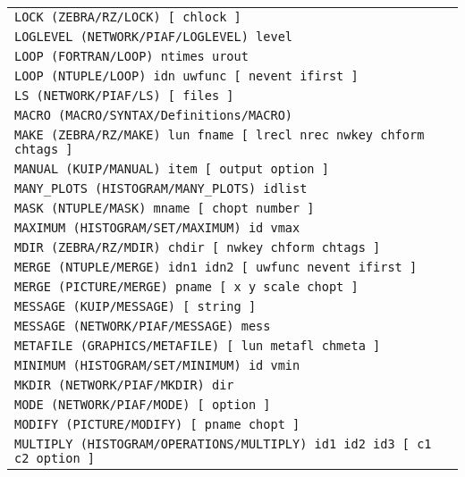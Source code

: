 \begin{longtable}{|>{\footnotesize\tt}lr|}
LOCK (ZEBRA/RZ/LOCK)  [ chlock ] & \pageref{ref:ZEBRA/RZ/LOCK}\\ 
LOGLEVEL (NETWORK/PIAF/LOGLEVEL)  level & \pageref{ref:NETWORK/PIAF/LOGLEVEL}\\ 
LOOP (FORTRAN/LOOP)  ntimes urout & \pageref{ref:FORTRAN/LOOP}\\ 
LOOP (NTUPLE/LOOP)  idn uwfunc [ nevent ifirst ] & \pageref{ref:NTUPLE/LOOP}\\ 
LS (NETWORK/PIAF/LS)  [ files ] & \pageref{ref:NETWORK/PIAF/LS}\\ 
MACRO (MACRO/SYNTAX/Definitions/MACRO)  & \pageref{ref:MACRO/SYNTAX/Definitions/MACRO}\\ 
MAKE (ZEBRA/RZ/MAKE)  lun fname [ lrecl nrec nwkey chform chtags ] & \pageref{ref:ZEBRA/RZ/MAKE}\\ 
MANUAL (KUIP/MANUAL)  item [ output option ] & \pageref{ref:KUIP/MANUAL}\\ 
MANY_PLOTS (HISTOGRAM/MANY_PLOTS)  idlist & \pageref{ref:HISTOGRAM/MANY_PLOTS}\\ 
MASK (NTUPLE/MASK)  mname [ chopt number ] & \pageref{ref:NTUPLE/MASK}\\ 
MAXIMUM (HISTOGRAM/SET/MAXIMUM)  id vmax & \pageref{ref:HISTOGRAM/SET/MAXIMUM}\\ 
MDIR (ZEBRA/RZ/MDIR)  chdir [ nwkey chform chtags ] & \pageref{ref:ZEBRA/RZ/MDIR}\\ 
MERGE (NTUPLE/MERGE)  idn1 idn2 [ uwfunc nevent ifirst ] & \pageref{ref:NTUPLE/MERGE}\\ 
MERGE (PICTURE/MERGE)  pname [ x y scale chopt ] & \pageref{ref:PICTURE/MERGE}\\ 
MESSAGE (KUIP/MESSAGE)  [ string ] & \pageref{ref:KUIP/MESSAGE}\\ 
MESSAGE (NETWORK/PIAF/MESSAGE)  mess & \pageref{ref:NETWORK/PIAF/MESSAGE}\\ 
METAFILE (GRAPHICS/METAFILE)  [ lun metafl chmeta ] & \pageref{ref:GRAPHICS/METAFILE}\\ 
MINIMUM (HISTOGRAM/SET/MINIMUM)  id vmin & \pageref{ref:HISTOGRAM/SET/MINIMUM}\\ 
MKDIR (NETWORK/PIAF/MKDIR)  dir & \pageref{ref:NETWORK/PIAF/MKDIR}\\ 
MODE (NETWORK/PIAF/MODE)  [ option ] & \pageref{ref:NETWORK/PIAF/MODE}\\ 
MODIFY (PICTURE/MODIFY)  [ pname chopt ] & \pageref{ref:PICTURE/MODIFY}\\ 
MULTIPLY (HISTOGRAM/OPERATIONS/MULTIPLY)  id1 id2 id3 [ c1 c2 option ] & \pageref{ref:HISTOGRAM/OPERATIONS/MULTIPLY}\\ 

\end{longtable}
